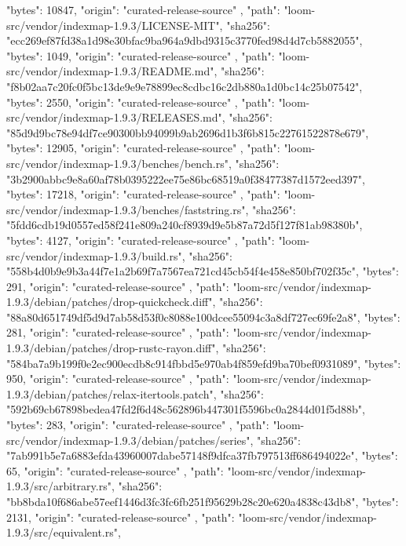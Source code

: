 {{      "bytes": 10847,
      "origin": "curated-release-source"
    },
    {
      "path": "loom-src/vendor/indexmap-1.9.3/LICENSE-MIT",
      "sha256": "ecc269ef87fd38a1d98e30bfac9ba964a9dbd9315c3770fed98d4d7cb5882055",
      "bytes": 1049,
      "origin": "curated-release-source"
    },
    {
      "path": "loom-src/vendor/indexmap-1.9.3/README.md",
      "sha256": "f8b02aa7c20fc0f5bc13de9e9e78899ec8cdbc16c2db880a1d0bc14c25b07542",
      "bytes": 2550,
      "origin": "curated-release-source"
    },
    {
      "path": "loom-src/vendor/indexmap-1.9.3/RELEASES.md",
      "sha256": "85d9d9bc78e94df7ce90300bb94099b9ab2696d1b3f6b815c22761522878e679",
      "bytes": 12905,
      "origin": "curated-release-source"
    },
    {
      "path": "loom-src/vendor/indexmap-1.9.3/benches/bench.rs",
      "sha256": "3b2900abbc9e8a60af78b0395222ee75e86bc68519a0f38477387d1572eed397",
      "bytes": 17218,
      "origin": "curated-release-source"
    },
    {
      "path": "loom-src/vendor/indexmap-1.9.3/benches/faststring.rs",
      "sha256": "5fdd6cdb19d0557ed58f241e809a240cf8939d9e5b87a72d5f127f81ab98380b",
      "bytes": 4127,
      "origin": "curated-release-source"
    },
    {
      "path": "loom-src/vendor/indexmap-1.9.3/build.rs",
      "sha256": "558b4d0b9e9b3a44f7e1a2b69f7a7567ea721cd45cb54f4e458e850bf702f35c",
      "bytes": 291,
      "origin": "curated-release-source"
    },
    {
      "path": "loom-src/vendor/indexmap-1.9.3/debian/patches/drop-quickcheck.diff",
      "sha256": "88a80d651749df5d9d7ab58d53f0c8088e100dcee55094c3a8df727ec69fe2a8",
      "bytes": 281,
      "origin": "curated-release-source"
    },
    {
      "path": "loom-src/vendor/indexmap-1.9.3/debian/patches/drop-rustc-rayon.diff",
      "sha256": "584ba7a9b199f0e2ec900ecdb8c914fbbd5e970ab4f859efd9ba70bef0931089",
      "bytes": 950,
      "origin": "curated-release-source"
    },
    {
      "path": "loom-src/vendor/indexmap-1.9.3/debian/patches/relax-itertools.patch",
      "sha256": "592b69cb67898bedea47fd2f6d48c562896b447301f5596bc0a2844d01f5d88b",
      "bytes": 283,
      "origin": "curated-release-source"
    },
    {
      "path": "loom-src/vendor/indexmap-1.9.3/debian/patches/series",
      "sha256": "7ab991b5e7a6883efda43960007dabe57148f9dfca37fb797513ff686494022e",
      "bytes": 65,
      "origin": "curated-release-source"
    },
    {
      "path": "loom-src/vendor/indexmap-1.9.3/src/arbitrary.rs",
      "sha256": "bb8bda10f686abe57eef1446d3fc3fc6fb251f95629b28c20e620a4838c43db8",
      "bytes": 2131,
      "origin": "curated-release-source"
    },
    {
      "path": "loom-src/vendor/indexmap-1.9.3/src/equivalent.rs",
}}

